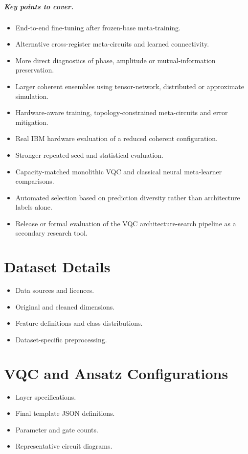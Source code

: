 \documentclass[]{UCD_CS_MSc_AAI_Report}
\newcommand{\sectionbrief}{\paragraph{Key points to cover.}}
\begin{document}
\sectionbrief
\begin{itemize}
    \item End-to-end fine-tuning after frozen-base meta-training.
    \item Alternative cross-register meta-circuits and learned connectivity.
    \item More direct diagnostics of phase, amplitude or mutual-information preservation.
    \item Larger coherent ensembles using tensor-network, distributed or approximate simulation.
    \item Hardware-aware training, topology-constrained meta-circuits and error mitigation.
    \item Real IBM hardware evaluation of a reduced coherent configuration.
    \item Stronger repeated-seed and statistical evaluation.
    \item Capacity-matched monolithic VQC and classical neural meta-learner comparisons.
    \item Automated selection based on prediction diversity rather than architecture labels alone.
    \item Release or formal evaluation of the VQC architecture-search pipeline as a secondary research tool.
\end{itemize}

\appendix

\chapter{Dataset Details}
\label{app:datasets}
\begin{itemize}
    \item Data sources and licences.
    \item Original and cleaned dimensions.
    \item Feature definitions and class distributions.
    \item Dataset-specific preprocessing.
\end{itemize}

\chapter{VQC and Ansatz Configurations}
\label{app:ansatze}
\begin{itemize}
    \item Layer specifications.
    \item Final template JSON definitions.
    \item Parameter and gate counts.
    \item Representative circuit diagrams.
\end{itemize}
\end{document}
